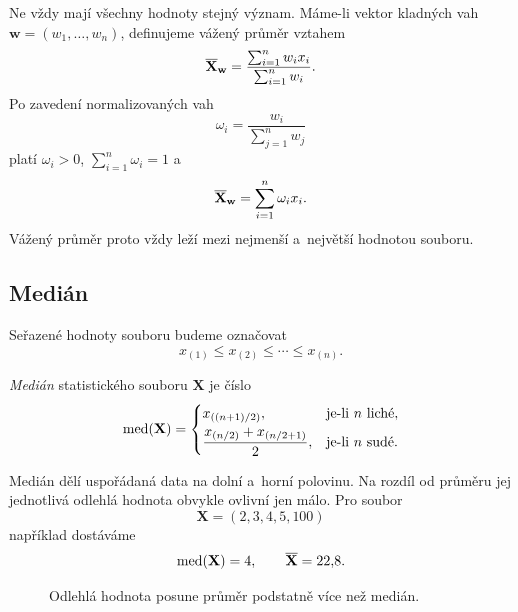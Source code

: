Ne vždy mají všechny hodnoty stejný význam. Máme-li vektor kladných vah
\(\mathbf{w}=(w_1,\ldots,w_n)\), definujeme vážený průměr vztahem
\[
    \overline{\mathbf{X}}_{\mathbf{w}}
    =
    \frac{\sum_{i=1}^{n}w_ix_i}{\sum_{i=1}^{n}w_i}.
\]
Po zavedení normalizovaných vah
\[
    \omega_i=\frac{w_i}{\sum_{j=1}^{n}w_j}
\]
platí \(\omega_i>0\), \(\sum_{i=1}^{n}\omega_i=1\) a
\[
    \overline{\mathbf{X}}_{\mathbf{w}}
    =
    \sum_{i=1}^{n}\omega_ix_i.
\]
Vážený průměr proto vždy leží mezi nejmenší a~největší hodnotou souboru.

\subsection{Medián}

Seřazené hodnoty souboru budeme označovat
\[
    x_{(1)}\leqslant x_{(2)}\leqslant\cdots\leqslant x_{(n)}.
\]

\begin{definition}\label{def:ai-median}
    \emph{Medián} statistického souboru \(\mathbf{X}\) je číslo
    \[
        \operatorname{med}(\mathbf{X})
        =
        \begin{cases}
            x_{((n+1)/2)}, & \text{je-li \(n\) liché},\\[1mm]
            \dfrac{x_{(n/2)}+x_{(n/2+1)}}{2},
            & \text{je-li \(n\) sudé}.
        \end{cases}
    \]
\end{definition}

Medián dělí uspořádaná data na dolní a~horní polovinu. Na rozdíl od průměru jej jednotlivá odlehlá hodnota obvykle ovlivní jen málo. Pro soubor
\[
    \mathbf{X}=(2,3,4,5,100)
\]
například dostáváme
\[
    \operatorname{med}(\mathbf{X})=4,
    \qquad
    \overline{\mathbf{X}}=22{,}8.
\]

\begin{figure}[ht]
    \centering
    
    \caption{Odlehlá hodnota posune průměr podstatně více než medián.}
    \label{fig:ai-prumer-median}
\end{figure}

